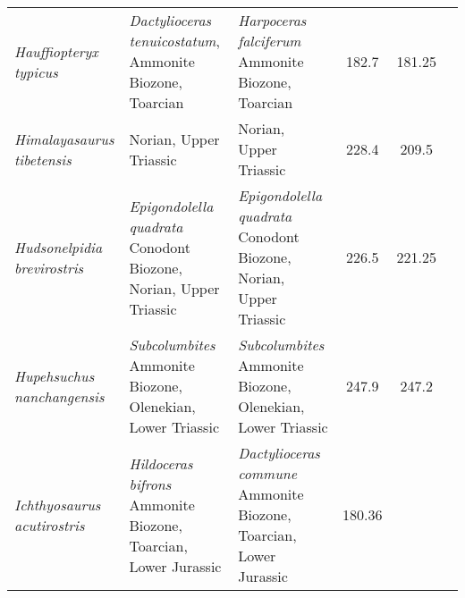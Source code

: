 \begin{longtabu}{>{\itshape}lXXSSl}
	Hauffiopteryx typicus                                &
        \emph{Dactylioceras tenuicostatum}, Ammonite Biozone, Toarcian
                                                             & \emph{Harpoceras
    falciferum} Ammonite Biozone, Toarcian
                                                             & 182.7
                                                             & 181.25
                                                             &
                                                             \cite{Maisch2008P,Caine2011P,Marek2015P} \\
	Himalayasaurus tibetensis                            & Norian, Upper
        Triassic
                                                             & Norian, Upper
        Triassic
                                                             & 228.4
                                                             & 209.5
                                                             & \cite{Motani1999P} \\                    
	Hudsonelpidia brevirostris                           &
        \emph{Epigondolella quadrata} Conodont Biozone, Norian, Upper Triassic
                                                             &
        \emph{Epigondolella quadrata} Conodont Biozone, Norian, Upper Triassic
                                                             & 226.5
                                                             & 221.25
                                                             &
                                                             \cite{McGowan1995CJES} \\                    
	Hupehsuchus nanchangensis                            &
        \emph{Subcolumbites} Ammonite Biozone, Olenekian, Lower Triassic
                                                             &
        \emph{Subcolumbites} Ammonite Biozone, Olenekian, Lower Triassic
                                                             & 247.9
                                                             & 247.2
                                                             &
                                                             \cite{Carroll1991PTRSBBS} \\                    
	Ichthyosaurus acutirostris                           & \emph{Hildoceras
        bifrons} Ammonite Biozone, Toarcian, Lower Jurassic
                                                             &
            \emph{Dactylioceras commune} Ammonite Biozone, Toarcian, Lower
            Jurassic
                                                             & 180.36

\end{longtabu}
